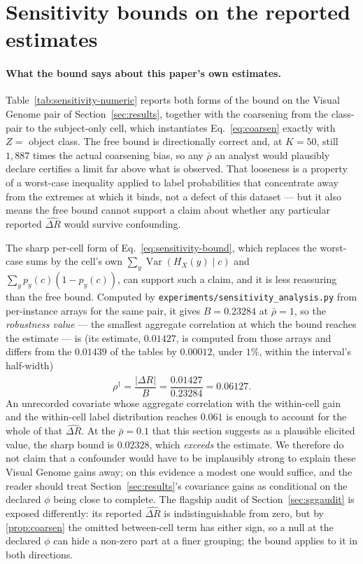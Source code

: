 \section{Sensitivity bounds on the reported estimates}\label{app:sensitivity}

\paragraph{What the bound says about this paper's own estimates.}
Table~\ref{tab:sensitivity-numeric} reports both forms of the bound on the Visual Genome
pair of Section~\ref{sec:results}, together with the coarsening from the class-pair to
the subject-only cell, which instantiates Eq.~\eqref{eq:coarsen} exactly with
$Z=$ object class. The free bound is directionally correct and, at $K=50$, still
$1{,}887$ times the actual coarsening bias, so any $\bar\rho$ an analyst would plausibly
declare certifies a limit far above what is observed. That looseness is a property of a
worst-case inequality applied to label probabilities that concentrate away from the
extremes at which it binds, not a defect of this dataset --- but it also means the free
bound cannot support a claim about whether any particular reported $\widehat{\Delta R}$
would survive confounding.

The sharp per-cell form of Eq.~\eqref{eq:sensitivity-bound}, which replaces the
worst-case sums by the cell's own $\sum_y\operatorname{Var}(H_X(y)\mid c)$ and
$\sum_yp_y(c)(1-p_y(c))$, can support such a claim, and it is less reassuring than the
free bound. Computed by \texttt{experiments/sensitivity\_analysis.py} from per-instance
arrays for the same pair, it gives $B=0.23284$ at $\bar\rho=1$, so the
\emph{robustness value} --- the smallest aggregate correlation at which the bound reaches
the estimate --- is
(its estimate, $0.01427$, is computed from those arrays and differs from the $0.01439$ of the
tables by $0.00012$, under $1\%$, within the interval's half-width)
\begin{equation}
\rho^\dagger=\frac{\bigl|\widehat{\Delta R}\bigr|}{B}
=\frac{0.01427}{0.23284}=0.06127 .
\label{eq:robustness-value}
\end{equation}
An unrecorded covariate whose aggregate correlation with the within-cell gain and the
within-cell label distribution reaches $0.061$ is enough to account for the whole of that
$\widehat{\Delta R}$. At the $\bar\rho=0.1$ that this section suggests as a plausible
elicited value, the sharp bound is $0.02328$, which \emph{exceeds} the estimate. We
therefore do not claim that a confounder would have to be implausibly strong to explain
these Visual Genome gains away; on this evidence a modest one would suffice, and the
reader should treat Section~\ref{sec:results}'s covariance gains as conditional on the
declared $\phi$ being close to complete. The flagship audit of
Section~\ref{sec:sggaudit} is exposed differently: its reported $\widehat{\Delta R}$ is
indistinguishable from zero, but by \cref{prop:coarsen} the omitted between-cell term has
either sign, so a null at the declared $\phi$ can hide a non-zero part at a finer grouping;
the bound applies to it in both directions.

